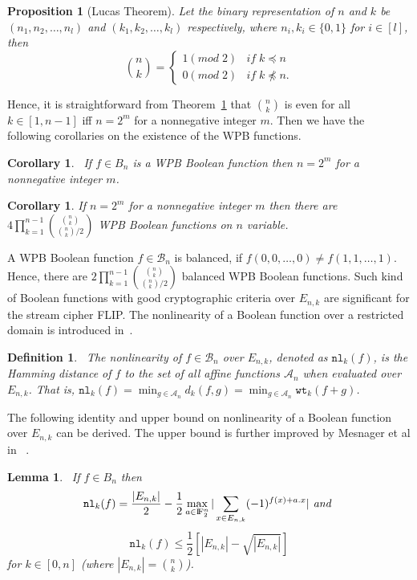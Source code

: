 \documentclass{article}[12pt]
\newtheorem{corollary}[theorem]{Corollary}
\newtheorem{lemma}[theorem]{Lemma}
\newtheorem{proposition}[theorem]{Proposition}
\newtheorem{definition}[theorem]{Definition}
\newcommand{\FF}{{\rm I\!F}}
\newcommand{\CA}{\mathcal{A}}
\newcommand{\CB}{\mathcal{B}}
\newcommand{\wt}{\mathtt{wt}}
\newcommand{\nl}{\mathtt{nl}}
\begin{document}
\begin{proposition}[Lucas Theorem] \label{Lucas}
Let the binary representation of $n$ and $k$ be $(n_1,n_2,\ldots,n_l)$ and $(k_1,k_2,\ldots,k_l)$ respectively, where $n_i, k_i \in \{0,1\}$ for $i \in [l]$, then
	$${n \choose k} = 
	    \begin{cases}
		     1 (\textit{mod} \; 2)  & \textit{if} \;  k \preceq n \\
		     0 (\textit{mod} \; 2)  & \textit{if} \;  k \npreceq n.
	    \end{cases}$$
\end{proposition}
Hence, it is straightforward from Theorem~\ref{Lucas} that $n \choose k$ is even for all $k \in [1,n-1]$ iff $n = 2^m$ for a nonnegative integer $m$. Then we have the following corollaries on the existence of the WPB functions.
\begin{corollary}~\cite{CMR17}\label{cor:WPBS}
If $f \in B_n$ is a WPB Boolean function then $n=2^{m}$ for a nonnegative integer $m$.
\end{corollary}
\begin{corollary}\label{cor:WPBN}
If $n = 2^m$ for a nonnegative integer $m$ then there are 
$\displaystyle {4\prod_{k = 1}^{n-1} {{{n \choose k}} \choose {{n \choose k}/2}}}$ WPB Boolean functions on $n$ variable.
\end{corollary}
A WPB Boolean function $f \in \CB_n$ is balanced, if $f(0,0, \ldots, 0) \neq f(1, 1, \ldots, 1)$. Hence, there are $\displaystyle {2\prod_{k = 1}^{n-1} {{{n \choose k}} \choose {{n \choose k}/2}}}$ balanced WPB Boolean functions.
Such kind of Boolean functions with good cryptographic criteria over $E_{n,k}$ are significant for the stream cipher FLIP. The nonlinearity of a Boolean function over a restricted domain is introduced in~\cite{CMR17}. 
\begin{definition}~\label{def:nl}
The nonlinearity of $f \in \CB_n$ over $E_{n,k}$, denoted as $\nl_k(f)$, is the Hamming distance of $f$ to the set of all affine functions $\CA_n$ when evaluated over $E_{n,k}$. That is, $\nl_k(f) = \min_{g \in \CA_n} d_k(f,g) = \min_{g \in \CA_n} \wt_k(f+g)$.
\end{definition}
The following identity and upper bound on nonlinearity of a Boolean function over $E_{n,k}$ can be derived. The upper bound is further improved by Mesnager et al in ~\cite{MZD19}.
\begin{lemma}~\cite{CMR17}\label{lem:nl}
If $f \in B_n$ then
$$ \nl_k(f) = \frac{|E_{n,k}|}{2}- \frac{1}{2}\max_{a \in \FF_2^n} | \sum_{x \in E_{n,k}} (-1)^{f(x) + a.x}| \textit{ and } $$
$$\nl_k(f) \leq \frac{1}{2} [|E_{n,k}| - \sqrt{|E_{n,k}|}]$$
for $k \in [0,n]$ (where $|E_{n,k}|= {n \choose k}$).
\end{lemma}
\end{document}
